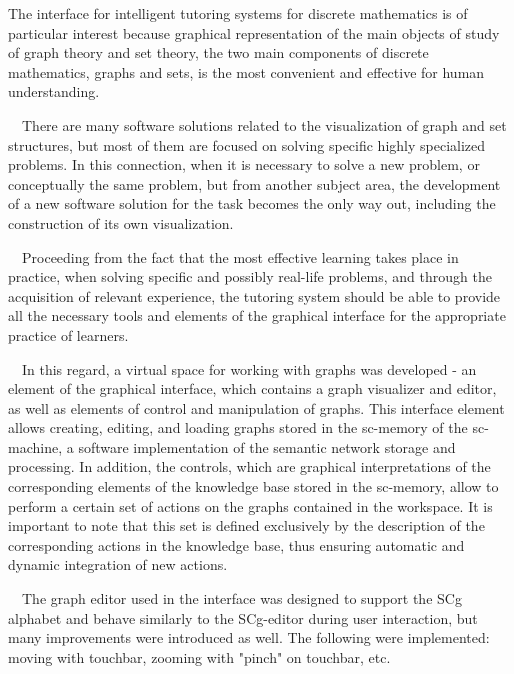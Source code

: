 \documentclass[a4paper]{article}
\begin{document}
\begin{multicols}{2}
\begin{justify}
The interface for intelligent tutoring systems for discrete mathematics is of particular interest because graphical representation of the main objects of study of
graph theory and set theory, the two main components
of discrete mathematics, graphs and sets, is the most
convenient and effective for human understanding.

~~There are many software solutions related to the visualization of graph and set structures, but most of them are
focused on solving specific highly specialized problems.
In this connection, when it is necessary to solve a new
problem, or conceptually the same problem, but from
another subject area, the development of a new software
solution for the task becomes the only way out, including
the construction of its own visualization.

~~Proceeding from the fact that the most effective learning takes place in practice, when solving specific and
possibly real-life problems, and through the acquisition
of relevant experience, the tutoring system should be
able to provide all the necessary tools and elements of
the graphical interface for the appropriate practice of
learners.

~~In this regard, a virtual space for working with graphs
was developed - an element of the graphical interface,
which contains a graph visualizer and editor, as well as
elements of control and manipulation of graphs. This
interface element allows creating, editing, and loading
graphs stored in the sc-memory of the sc-machine, a
software implementation of the semantic network storage
and processing. In addition, the controls, which are
graphical interpretations of the corresponding elements
of the knowledge base stored in the sc-memory, allow to
perform a certain set of actions on the graphs contained
in the workspace. It is important to note that this set is defined exclusively by the description of the corresponding
actions in the knowledge base, thus ensuring automatic
and dynamic integration of new actions.

~~The graph editor used in the interface was designed
to support the SCg alphabet and behave similarly to the
SCg-editor during user interaction, but many improvements were introduced as well. The following were implemented: moving with touchbar, zooming with "pinch"
on touchbar, etc.


\end{justify}
\end{multicols}
\end{document}
